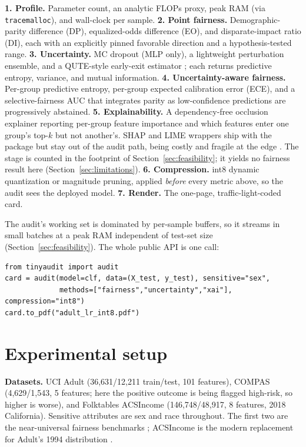 \documentclass{article}
\begin{document}
\textbf{1. Profile.} Parameter count, an analytic FLOPs proxy, peak RAM (via \texttt{tracemalloc}), and wall-clock per sample.
\textbf{2. Point fairness.} Demographic-parity difference (DP), equalized-odds difference (EO), and disparate-impact ratio (DI), each with an explicitly pinned favorable direction and a hypothesis-tested range.
\textbf{3. Uncertainty.} MC dropout (MLP only), a lightweight perturbation ensemble, and a QUTE-style early-exit estimator \cite{ghanathe2025}; each returns predictive entropy, variance, and mutual information.
\textbf{4. Uncertainty-aware fairness.} Per-group predictive entropy, per-group expected calibration error (ECE), and a selective-fairness AUC that integrates parity as low-confidence predictions are progressively abstained.
\textbf{5. Explainability.} A dependency-free occlusion explainer reporting per-group feature importance and which features enter one group's top-$k$ but not another's. SHAP and LIME wrappers ship with the package but stay out of the audit path, being costly and fragile at the edge \cite{salih2025,nguyen2024}. The stage is counted in the footprint of Section~\ref{sec:feasibility}; it yields no fairness result here (Section~\ref{sec:limitations}).
\textbf{6. Compression.} int8 dynamic quantization or magnitude pruning, applied \emph{before} every metric above, so the audit sees the deployed model.
\textbf{7. Render.} The one-page, traffic-light-coded card.

The audit's working set is dominated by per-sample buffers, so it streams in small batches at a peak RAM independent of test-set size (Section~\ref{sec:feasibility}). The whole public API is one call:

\begin{verbatim}
from tinyaudit import audit
card = audit(model=clf, data=(X_test, y_test), sensitive="sex",
             methods=["fairness","uncertainty","xai"], compression="int8")
card.to_pdf("adult_lr_int8.pdf")
\end{verbatim}

\section{Experimental setup}

\textbf{Datasets.} UCI Adult \cite{kohavi1996} (36{,}631/12{,}211 train/test, 101 features), COMPAS \cite{angwin2016} (4{,}629/1{,}543, 5 features; here the positive outcome is being flagged high-risk, so higher is worse), and Folktables ACSIncome \cite{ding2021} (146{,}748/48{,}917, 8 features, 2018 California). Sensitive attributes are sex and race throughout. The first two are the near-universal fairness benchmarks \cite{fabris2022}; ACSIncome is the modern replacement for Adult's 1994 distribution \cite{ding2021}.
\end{document}
